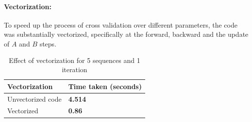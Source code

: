\documentclass[english]{article}
\begin{document}
\paragraph{Vectorization:}
To speed up the process of cross validation over different parameters, the code was substantially vectorized, specifically at the forward, backward and the update of $A$ and $B$ steps. 
\begin{table}[h]
\centering
\caption{Effect of vectorization for 5 sequences and 1 iteration}
\begin{tabular}{|l|l|}
\hline
\textbf{Vectorization} & \textbf{Time taken (seconds)} \\ \hline
Unvectorized code & \textbf{4.514} \\ \hline
Vectorized & \textbf{0.86} \\ \hline
\end{tabular}
\end{table}
\end{document}
